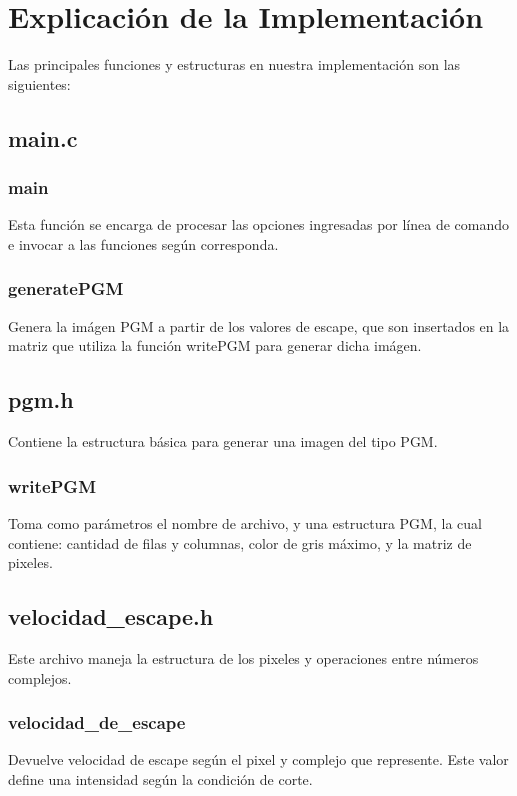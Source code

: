 \documentclass[a4paper,10pt]{article}
\begin{document}
\pagebreak



\section{Explicaci\'on de la Implementaci\'on}
Las principales funciones y estructuras en nuestra implementaci\'on son las siguientes:

\subsection{main.c}


\subsubsection{main}
Esta funci\'on se encarga de procesar las opciones ingresadas por l\'inea de comando e invocar a las funciones  seg\'un corresponda.

\subsubsection{generatePGM}
Genera la im\'agen PGM a partir de los valores de escape, que son insertados en la matriz que utiliza la funci\'on writePGM para generar dicha im\'agen.

\subsection{pgm.h}
Contiene la estructura b\'asica para generar una imagen del tipo PGM.

\subsubsection{writePGM}
Toma como par\'ametros el nombre de archivo, y una estructura PGM, la cual contiene: cantidad de filas y columnas, color de gris m\'aximo, y la matriz de pixeles.

\subsection{velocidad\_escape.h}
Este archivo maneja la estructura de los pixeles y operaciones entre n\'umeros complejos.

\subsubsection{velocidad\_de\_escape}
Devuelve velocidad de escape seg\'un el pixel y complejo que represente. Este valor define una intensidad seg\'un la condici\'on de corte.
\end{document}
